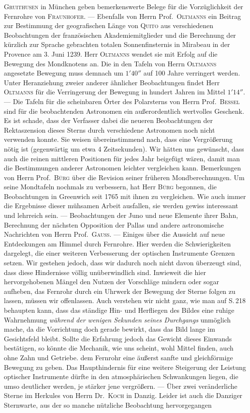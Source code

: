 \textsc{Gruithusen} in München geben bemerkenswerte Belege für die Vorzüglichkeit der Fernrohre von \textsc{Fraunhofer}. --- Ebenfalls von Herrn Prof.\ \textsc{Oltmanns} ein Beitrag zur Bestimmung der geografischen Länge von \textsc{Quito} aus verschiedenen Beobachtungen der französischen Akademiemitglieder und die Berechnung der kürzlich zur Sprache gebrachten totalen Sonnenfinsternis in Mirabeau in der Provence am 3. Juni 1239. Herr \textsc{Oltmanns} wendet sie mit Erfolg auf die Bewegung des Mondknotens an. Die in den Tafeln von Herrn \textsc{Oltmanns} angesetzte Bewegung muss demnach um $1'40''$ auf 100 Jahre verringert werden. Unter Heranziehung zweier anderer ähnlicher Beobachtungen findet Herr \textsc{Oltmanns} für die Verringerung der Bewegung in hundert Jahren im Mittel $1'14''$. --- Die Tafeln für die scheinbaren Örter des Polarsterns von Herrn Prof.\ \textsc{Bessel} sind für die beobachtenden Astronomen ein außerordentlich wertvolles Geschenk. Es ist schade, dass der Verfasser dabei die neueren Beobachtungen der Rektaszension dieses Sterns durch verschiedene Astronomen noch nicht verwenden konnte. Sie weisen übereinstimmend nach, dass eine Vergrößerung nötig ist (gegenwärtig um etwa 4 Zeitsekunden). Wir hätten uns gewünscht, dass auch die reinen mittleren Positionen für jedes Jahr beigefügt wären, damit man die Bestimmungen anderer Astronomen leichter vergleichen kann. Bemerkungen von Herrn Prof.\ \textsc{Bürg} über die Revision seiner früheren Mondberechnungen. Um seine Mondtafeln nochmals zu verbessern, hat Herr \textsc{Bürg} begonnen, die Beobachtungen in Greenwich seit 1765 mit ihnen zu vergleichen. Wie auch immer die Ergebnisse dieser mühsamen Arbeit ausfallen, sie werden gewiss interessant und lehrreich sein. --- Beobachtungen der Juno und neue Elemente ihrer Bahn, Berechnung der nächsten Opposition der Pallas und andere astronomische Nachrichten von Herrn Prof.\ \textsc{Gauss}. --- Einiges über die Aussicht auf neue Entdeckungen am Himmel durch Fernrohre. Hier werden die Schwierigkeiten dargelegt, die einer weiteren Verbesserung der optischen Instrumente Grenzen setzen. Wir gestehen jedoch, dass wir dadurch noch nicht davon überzeugt sind, dass diese Hindernisse völlig unüberwindlich sind. Inwieweit die hier hervorgehobenen Mängel den Nutzen der Vorschläge mindern oder sogar aufheben, das Fernrohr durch ein Uhrwerk der Bewegung der Sterne folgen zu lassen, müssen wir offenlassen. Auch verstehen wir nicht ganz, wie man auf S.\,218 behaupten kann, dass das ständige Hin- und Herfliegen des Bildes eine ruhige Wahrnehmung \emph{während der wenigen Sekunden seines Durchgangs} unmöglich mache, da die Vorrichtung doch gerade bewirkt, dass das Bild lange im Gesichtsfeld bleibt. Sollte die Erfahrung jedoch das Gewicht dieses Einwands bestätigen, so könnte die Mechanik, wie uns scheint, wohl Mittel finden, auch ohne Zahn und Getriebe. dem Fernrohr eine äußerst sanfte und gleichförmige Bewegung zu geben. Das Haupthindernis für eine weitere Steigerung der Leistung optischer Instrumente dürfte in den atmosphärischen Schwankungen liegen, die umso deutlicher werden, je stärker jene vergrößern. --- Über zwei veränderliche Sterne im Herkules von Herrn Dr.\ \textsc{Koch} in Danzig. Leider ist auch die Danziger Sternwarte, aus der so manche nützliche Beobachtung hervorgegangen 